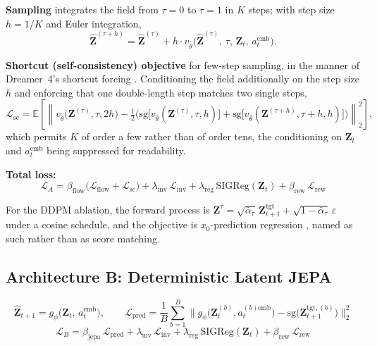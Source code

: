 \documentclass[12pt, a4paper]{article}
\begin{document}
\noindent \textbf{Sampling} integrates the field from $\tau = 0$ to $\tau = 1$ in $K$ steps; with step size $h = 1/K$ and Euler integration,
\begin{equation}
    \hat{\mathbf{Z}}^{(\tau + h)} = \hat{\mathbf{Z}}^{(\tau)} + h \cdot v_{\hat{\theta}}\big(\hat{\mathbf{Z}}^{(\tau)},\, \tau,\, \mathbf{Z}_t,\, a_t^\text{emb}\big).
\end{equation}

\noindent \textbf{Shortcut (self-consistency) objective} for few-step sampling, in the manner of Dreamer~4's shortcut forcing \citep{hafner2025dreamer4}. Conditioning the field additionally on the step size $h$ and enforcing that one double-length step matches two single steps,
\begin{equation}
    \mathcal{L}_\text{sc} = \mathbb{E}\left[\left\lVert v_{\hat{\theta}}\big(\mathbf{Z}^{(\tau)}, \tau, 2h\big) - \tfrac{1}{2}\Big(\mathrm{sg}\big[v_{\hat{\theta}}(\mathbf{Z}^{(\tau)}, \tau, h)\big] + \mathrm{sg}\big[v_{\hat{\theta}}(\mathbf{Z}^{(\tau+h)}, \tau+h, h)\big]\Big)\right\rVert_2^2\right],
\end{equation}
which permits $K$ of order a few rather than of order tens, the conditioning on $\mathbf{Z}_t$ and $a_t^\text{emb}$ being suppressed for readability.

\noindent \textbf{Total loss:}
\begin{equation}
    \boxed{\mathcal{L}_A = \beta_\text{flow}\big(\mathcal{L}_\text{flow} + \mathcal{L}_\text{sc}\big) + \lambda_\text{inv}\,\mathcal{L}_\text{inv} + \lambda_\text{reg}\,\mathrm{SIGReg}(\mathbf{Z}_t) + \beta_\text{rew}\,\mathcal{L}_\text{rew}}
\end{equation}

\noindent For the DDPM ablation, the forward process is $\mathbf{Z}^\tau = \sqrt{\bar{\alpha}_\tau}\,\mathbf{Z}_{t+1}^{\text{tgt}} + \sqrt{1-\bar{\alpha}_\tau}\,\varepsilon$ under a cosine schedule, and the objective is $x_0$-prediction regression \citep{ho2020ddpm}, named as such rather than as score matching.

\subsection{Architecture B: Deterministic Latent JEPA}

\begin{equation}
    \hat{\mathbf{Z}}_{t+1} = g_\phi\big(\mathbf{Z}_t,\, a_t^\text{emb}\big), \qquad
    \mathcal{L}_\text{pred} = \frac{1}{B}\sum_{b=1}^{B} \big\lVert g_\phi\big(\mathbf{Z}_t^{(b)}, a_t^{(b)\text{emb}}\big) - \mathrm{sg}\big(\mathbf{Z}_{t+1}^{\text{tgt},(b)}\big)\big\rVert_2^2
\end{equation}
\begin{equation}
    \boxed{\mathcal{L}_B = \beta_\text{jepa}\,\mathcal{L}_\text{pred} + \lambda_\text{inv}\,\mathcal{L}_\text{inv} + \lambda_\text{reg}\,\mathrm{SIGReg}(\mathbf{Z}_t) + \beta_\text{rew}\,\mathcal{L}_\text{rew}}
\end{equation}
\end{document}
